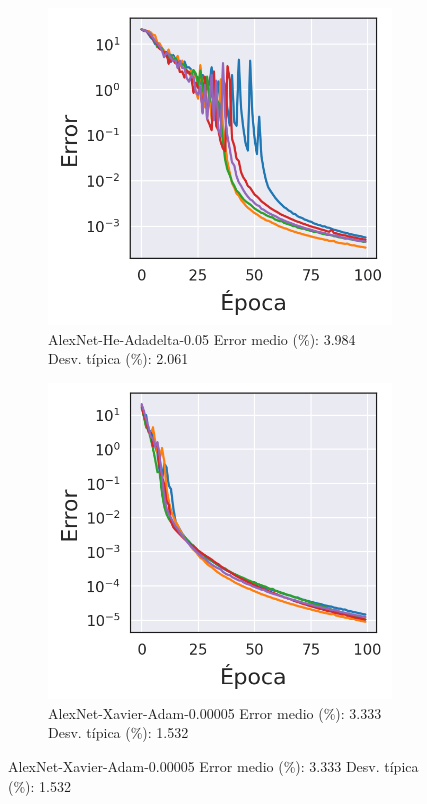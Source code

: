 \begin{figure}[H]
\centering
    \begin{subfigure}{.45\textwidth}
        \centering
        \includegraphics[width=1\linewidth]{imagenes/image_classification/original_dataset/loss_alexnet_he_adadelta_05.png}
        \caption{AlexNet-He-Adadelta-0.05 \hspace{\textwidth} Error medio (\%): 3.984 \hspace{\textwidth} Desv. típica (\%): 2.061}
    \end{subfigure}%
    \begin{subfigure}{.45\textwidth}
        \centering
        \includegraphics[width=1\linewidth]{imagenes/image_classification/original_dataset/loss_alexnet_xavier_adam_00005.png}
        \caption{AlexNet-Xavier-Adam-0.00005 \hspace{\textwidth} Error medio (\%): 3.333 \hspace{\textwidth} Desv. típica (\%): 1.532}
    \end{subfigure}%


\end{figure}
